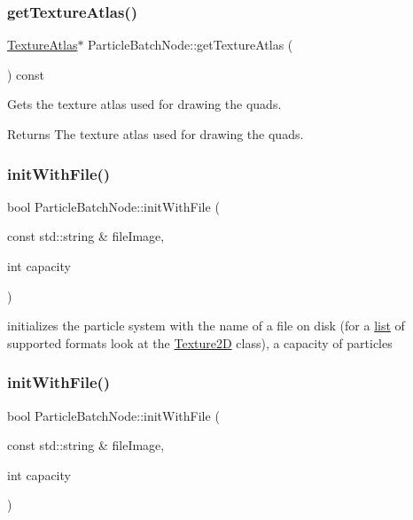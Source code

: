 \subsubsection{\texorpdfstring{get\+Texture\+Atlas()}{getTextureAtlas()}\hspace{0.1cm}{\footnotesize\ttfamily [2/2]}}
{\footnotesize\ttfamily \hyperlink{classTextureAtlas}{Texture\+Atlas}$\ast$ Particle\+Batch\+Node\+::get\+Texture\+Atlas (\begin{DoxyParamCaption}{ }\end{DoxyParamCaption}) const\hspace{0.3cm}{\ttfamily [inline]}}

Gets the texture atlas used for drawing the quads.

\begin{DoxyReturn}{Returns}
The texture atlas used for drawing the quads. 
\end{DoxyReturn}
\mbox{\label{classParticleBatchNode_a8d828f06462482ccfa1210502572a2c7}} 
\subsubsection{\texorpdfstring{init\+With\+File()}{initWithFile()}\hspace{0.1cm}{\footnotesize\ttfamily [1/2]}}
{\footnotesize\ttfamily bool Particle\+Batch\+Node\+::init\+With\+File (\begin{DoxyParamCaption}\item[{const std\+::string \&}]{file\+Image,  }\item[{int}]{capacity }\end{DoxyParamCaption})}

initializes the particle system with the name of a file on disk (for a \hyperlink{protocollist-p}{list} of supported formats look at the \hyperlink{classTexture2D}{Texture2D} class), a capacity of particles \mbox{\label{classParticleBatchNode_a8d828f06462482ccfa1210502572a2c7}} 
\subsubsection{\texorpdfstring{init\+With\+File()}{initWithFile()}\hspace{0.1cm}{\footnotesize\ttfamily [2/2]}}
{\footnotesize\ttfamily bool Particle\+Batch\+Node\+::init\+With\+File (\begin{DoxyParamCaption}\item[{const std\+::string \&}]{file\+Image,  }\item[{int}]{capacity }\end{DoxyParamCaption})}


